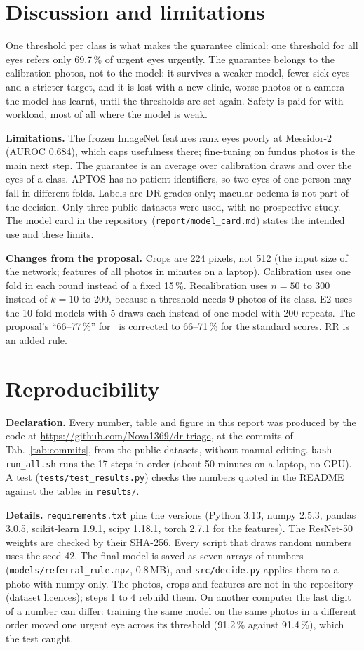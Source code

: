 \documentclass[10pt,twocolumn,letterpaper]{article}
\newcommand{\pct}{\,\%}
\begin{document}
\section{Discussion and limitations}
One threshold per class is what makes the guarantee clinical: one threshold for all eyes refers only 69.7\pct{} of urgent eyes urgently. The guarantee belongs to the calibration photos, not to the model: it survives a weaker model, fewer sick eyes and a stricter target, and it is lost with a new clinic, worse photos or a camera the model has learnt, until the thresholds are set again. Safety is paid for with workload, most of all where the model is weak.

\textbf{Limitations.} The frozen ImageNet features rank eyes poorly at Messidor-2 (AUROC 0.684), which caps usefulness there; fine-tuning on fundus photos is the main next step. The guarantee is an average over calibration draws and over the eyes of a class. APTOS has no patient identifiers, so two eyes of one person may fall in different folds. Labels are DR grades only; macular oedema is not part of the decision. Only three public datasets were used, with no prospective study. The model card in the repository (\texttt{report/model\_card.md}) states the intended use and these limits.

\textbf{Changes from the proposal.} Crops are 224 pixels, not 512 (the input size of the network; features of all photos in minutes on a laptop). Calibration uses one fold in each round instead of a fixed 15\pct. Recalibration uses $n=50$ to 300 instead of $k=10$ to 200, because a threshold needs 9 photos of its class. E2 uses the 10 fold models with 5 draws each instead of one model with 200 repeats. The proposal's ``66--77\pct'' for~\cite{hasan} is corrected to 66--71\pct{} for the standard scores. RR is an added rule.

\section{Reproducibility}
\textbf{Declaration.} Every number, table and figure in this report was produced by the code at \url{https://github.com/Nova1369/dr-triage}, at the commits of Tab.~\ref{tab:commits}, from the public datasets, without manual editing. \texttt{bash run\_all.sh} runs the 17 steps in order (about 50 minutes on a laptop, no GPU). A test (\texttt{tests/test\_results.py}) checks the numbers quoted in the README against the tables in \texttt{results/}.

\textbf{Details.} \texttt{requirements.txt} pins the versions (Python 3.13, numpy 2.5.3, pandas 3.0.5, scikit-learn 1.9.1, scipy 1.18.1, torch 2.7.1 for the features). The ResNet-50 weights are checked by their SHA-256. Every script that draws random numbers uses the seed 42. The final model is saved as seven arrays of numbers (\texttt{models/referral\_rule.npz}, 0.8\,MB), and \texttt{src/decide.py} applies them to a photo with numpy only. The photos, crops and features are not in the repository (dataset licences); steps 1 to 4 rebuild them. On another computer the last digit of a number can differ: training the same model on the same photos in a different order moved one urgent eye across its threshold (91.2\pct{} against 91.4\pct), which the test caught.
\end{document}

